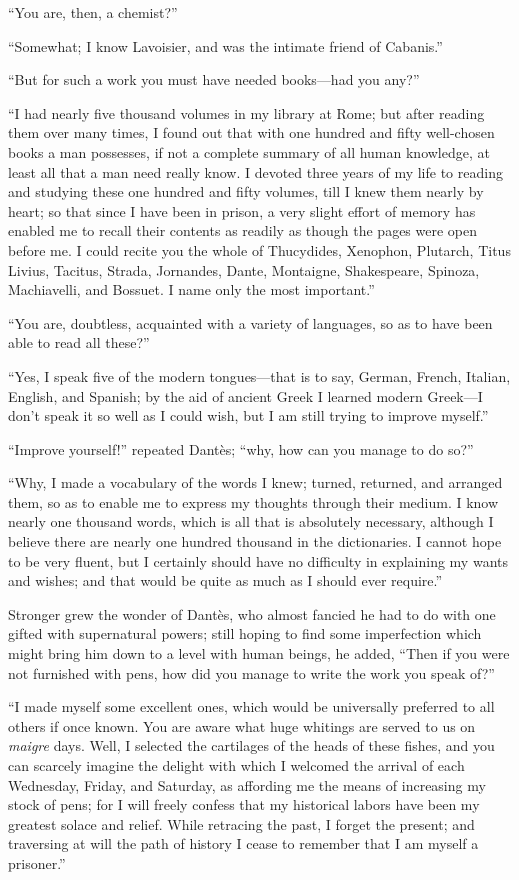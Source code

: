 “You are, then, a chemist?”

“Somewhat; I know Lavoisier, and was the intimate friend of Cabanis.”

“But for such a work you must have needed books—had you any?”

“I had nearly five thousand volumes in my library at Rome; but after
reading them over many times, I found out that with one hundred and
fifty well-chosen books a man possesses, if not a complete summary of
all human knowledge, at least all that a man need really know. I
devoted three years of my life to reading and studying these one
hundred and fifty volumes, till I knew them nearly by heart; so that
since I have been in prison, a very slight effort of memory has enabled
me to recall their contents as readily as though the pages were open
before me. I could recite you the whole of Thucydides, Xenophon,
Plutarch, Titus Livius, Tacitus, Strada, Jornandes, Dante, Montaigne,
Shakespeare, Spinoza, Machiavelli, and Bossuet. I name only the most
important.”

“You are, doubtless, acquainted with a variety of languages, so as to
have been able to read all these?”

“Yes, I speak five of the modern tongues—that is to say, German,
French, Italian, English, and Spanish; by the aid of ancient Greek I
learned modern Greek—I don’t speak it so well as I could wish, but I am
still trying to improve myself.”

“Improve yourself!” repeated Dantès; “why, how can you manage to do
so?”

“Why, I made a vocabulary of the words I knew; turned, returned, and
arranged them, so as to enable me to express my thoughts through their
medium. I know nearly one thousand words, which is all that is
absolutely necessary, although I believe there are nearly one hundred
thousand in the dictionaries. I cannot hope to be very fluent, but I
certainly should have no difficulty in explaining my wants and wishes;
and that would be quite as much as I should ever require.”

Stronger grew the wonder of Dantès, who almost fancied he had to do
with one gifted with supernatural powers; still hoping to find some
imperfection which might bring him down to a level with human beings,
he added, “Then if you were not furnished with pens, how did you manage
to write the work you speak of?”

“I made myself some excellent ones, which would be universally
preferred to all others if once known. You are aware what huge whitings
are served to us on \textit{maigre} days. Well, I selected the cartilages of
the heads of these fishes, and you can scarcely imagine the delight
with which I welcomed the arrival of each Wednesday, Friday, and
Saturday, as affording me the means of increasing my stock of pens; for
I will freely confess that my historical labors have been my greatest
solace and relief. While retracing the past, I forget the present; and
traversing at will the path of history I cease to remember that I am
myself a prisoner.”

